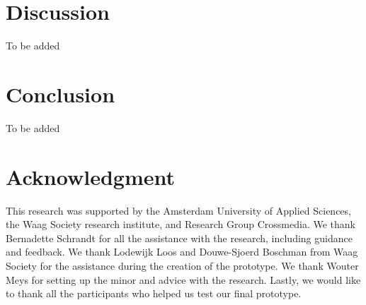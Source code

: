 \documentclass[sigconf]{acmart}
\begin{document}

\section{Discussion}
To be added


\section{Conclusion}
To be added


\section{Acknowledgment}
This research was supported by the Amsterdam University of Applied Sciences, the Waag Society research
institute, and Research Group Crossmedia. We thank Bernadette Schrandt for all the assistance
with the research, including guidance and feedback. We thank Lodewijk Loos and Douwe-Sjoerd Boschman 
from Waag Society for the assistance during the creation of the prototype. We thank Wouter Meys for setting
up the minor and advice with the research. Lastly, we would like to thank all the participants who helped
us test our final prototype.





\end{document}
